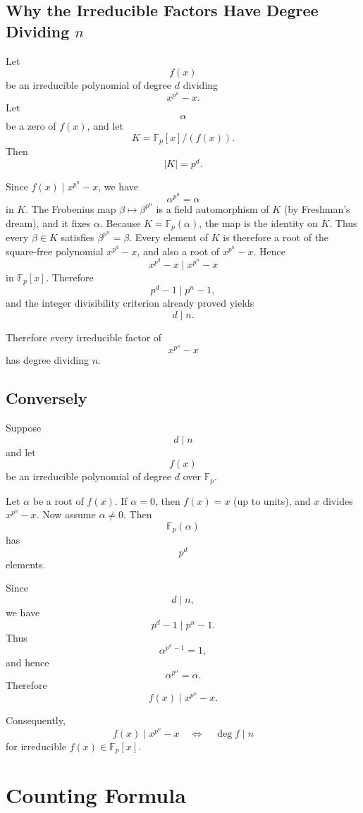 \documentclass[11pt]{article}
\theoremstyle{remark}
\newcommand{\Fp}{\mathbb F_p}
\newcommand{\divides}{\mid}
\begin{document}
\subsection{Why the Irreducible Factors Have Degree Dividing $n$}

Let
\[
    f(x)
\]
be an irreducible polynomial of degree $d$ dividing
\[
    x^{p^n}-x.
\]
Let
\[
    \alpha
\]
be a zero of $f(x)$, and let
\[
    K=\Fp[x]/(f(x)).
\]
Then
\[
    |K|=p^d.
\]

Since $f(x)\mid x^{p^n}-x$, we have
\[
    \alpha^{p^n}=\alpha
\]
in $K$. The Frobenius map $\beta\mapsto\beta^{p^n}$ is a field automorphism
of $K$ (by Freshman's dream), and it fixes $\alpha$. Because
$K=\Fp(\alpha)$, the map is the identity on $K$. Thus every $\beta\in K$
satisfies $\beta^{p^n}=\beta$. Every element of $K$ is therefore a root of
the square-free polynomial $x^{p^d}-x$, and also a root of $x^{p^n}-x$.
Hence
\[
    x^{p^d}-x
    \divides
    x^{p^n}-x
\]
in $\Fp[x]$. Therefore
\[
    p^d-1\mid p^n-1,
\]
and the integer divisibility criterion already proved yields
\[
    d\mid n.
\]

Therefore every irreducible factor of
\[
    x^{p^n}-x
\]
has degree dividing $n$.

\subsection{Conversely}

Suppose
\[
    d\mid n
\]
and let
\[
    f(x)
\]
be an irreducible polynomial of degree $d$ over $\Fp$.

Let $\alpha$ be a root of $f(x)$. If $\alpha=0$, then $f(x)=x$ (up to units),
and $x$ divides $x^{p^n}-x$. Now assume $\alpha\neq0$. Then
\[
    \Fp(\alpha)
\]
has
\[
    p^d
\]
elements.

Since
\[
    d\mid n,
\]
we have
\[
    p^d-1\mid p^n-1.
\]
Thus
\[
    \alpha^{p^n-1}=1,
\]
and hence
\[
    \alpha^{p^n}=\alpha.
\]
Therefore
\[
    f(x)\mid x^{p^n}-x.
\]

Consequently,
\[
    \boxed{
    f(x)\mid x^{p^n}-x
    \quad\Longleftrightarrow\quad
    \deg f\mid n
    }
\]
for irreducible $f(x)\in\Fp[x]$.

\section{Counting Formula}
\end{document}
